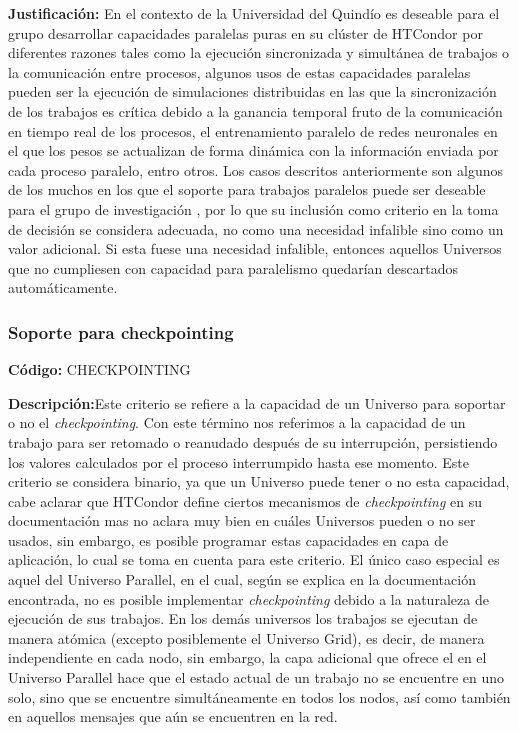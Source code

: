 \textbf{Justificación:} En el contexto de la Universidad del Quindío es deseable para el
grupo \GRID desarrollar capacidades paralelas puras en su clúster de HTCondor por
diferentes razones tales como la ejecución sincronizada y simultánea de trabajos o
la comunicación entre procesos, algunos usos de estas capacidades paralelas
pueden ser la ejecución de simulaciones distribuidas en las que la sincronización de
los trabajos es crítica debido a la ganancia temporal fruto de la comunicación en
tiempo real de los procesos, el entrenamiento paralelo de redes neuronales en el
que los pesos se actualizan de forma dinámica con la información enviada por cada
proceso paralelo, entro otros. Los casos descritos anteriormente son algunos de los
muchos en los que el soporte para trabajos paralelos puede ser deseable para el
grupo de investigación \GRID, por lo que su inclusión como criterio en la toma de
decisión se considera adecuada, no como una necesidad infalible sino como un
valor adicional. Si esta fuese una necesidad infalible, entonces aquellos Universos
que no cumpliesen con capacidad para paralelismo quedarían descartados
automáticamente.

\subsubsection{Soporte para checkpointing}
\textbf{Código:} CHECKPOINTING

\textbf{Descripción:}Este criterio se refiere a la capacidad de un Universo para soportar o
no el \textit{checkpointing}. Con este término nos referimos a la capacidad de un trabajo
para ser retomado o reanudado después de su interrupción, persistiendo los valores
calculados por el proceso interrumpido hasta ese momento. Este criterio se
considera binario, ya que un Universo puede tener o no esta capacidad, cabe aclarar
que HTCondor define ciertos mecanismos de \textit{checkpointing} en su documentación
mas no aclara muy bien en cuáles Universos pueden o no ser usados, sin embargo,
es posible programar estas capacidades en capa de aplicación, lo cual se toma en
cuenta para este criterio. El único caso especial es aquel del Universo Parallel, en
el cual, según se explica en la documentación encontrada, no es posible
implementar \textit{checkpointing} debido a la naturaleza de ejecución de sus trabajos. En
los demás universos los trabajos se ejecutan de manera atómica (excepto
posiblemente el Universo Grid), es decir, de manera independiente en cada nodo,
sin embargo, la capa adicional que ofrece el \MPI en el Universo Parallel hace que
el estado actual de un trabajo no se encuentre en uno solo, sino que se encuentre
simultáneamente en todos los nodos, así como también en aquellos mensajes que
aún se encuentren en la red.


